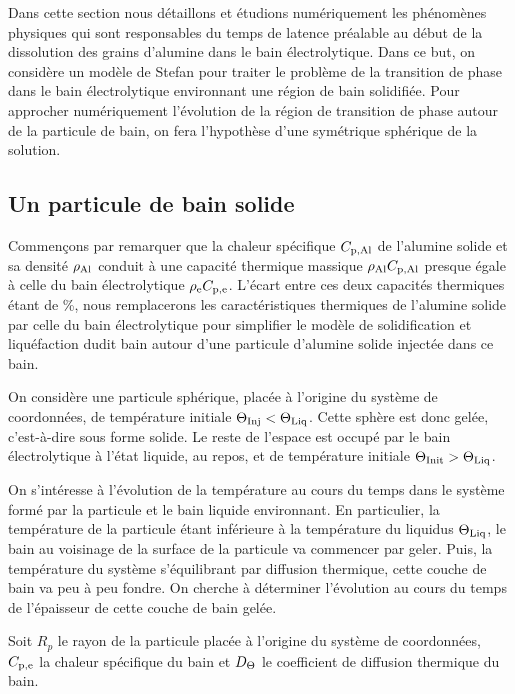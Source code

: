Dans cette section nous détaillons et étudions numériquement les
phénomènes physiques qui sont responsables du temps de latence
préalable au début de la dissolution des grains d'alumine dans le bain
électrolytique. Dans ce but, on considère un modèle de Stefan pour
traiter le problème de la transition de phase dans le bain
électrolytique environnant une région de bain solidifiée. Pour
approcher numériquement l'évolution de la région de transition de
phase autour de la particule de bain, on fera l'hypothèse d'une
symétrique sphérique de la solution.

\subsection{Un particule de bain solide}
Commençons par remarquer que la chaleur spécifique $C_{\mathrm{p,Al}}$
de l'alumine solide et sa densité $\rho_\mathrm{Al}$ conduit à une
capacité thermique massique $\rho_\mathrm{Al}C_{\mathrm{p,Al}}$ presque
égale à celle du bain électrolytique
$\rho_\mathrm{e}C_{\mathrm{p,e}}$. L'écart entre ces deux
capacités thermiques étant de \num{}\%, nous remplacerons les
caractéristiques thermiques de l'alumine solide par celle du bain
électrolytique pour simplifier le modèle de solidification et
liquéfaction dudit bain autour d'une particule d'alumine solide
injectée dans ce bain.

On considère une particule sphérique, placée à l'origine du système
de coordonnées, de température initiale $\Theta_\text{Inj}<\Theta_\text{Liq}$. Cette sphère
est donc gelée, c'est-à-dire sous forme solide. Le reste de l'espace
est occupé par le bain électrolytique à l'état liquide, au repos, et
de température initiale $\Theta_\text{Init} > \Theta_\text{Liq}$.

On s'intéresse à l'évolution de la température au cours du
temps dans le système formé par la particule et le
bain liquide environnant. En particulier, la température de la
particule étant inférieure à la température du liquidus
$\Theta_\text{Liq}$, le bain au voisinage de la surface de la particule va
commencer par geler. Puis, la température du système s'équilibrant par
diffusion thermique, cette couche de bain va peu à peu fondre. On
cherche à déterminer l'évolution au cours du temps de l'épaisseur de
cette couche de bain gelée.

Soit $R_p$ le rayon de la particule placée à l'origine du
système de coordonnées, $C_{\mathrm{p,e}}$ la chaleur spécifique du bain et
$D_\Theta$ le coefficient de diffusion thermique du bain.

